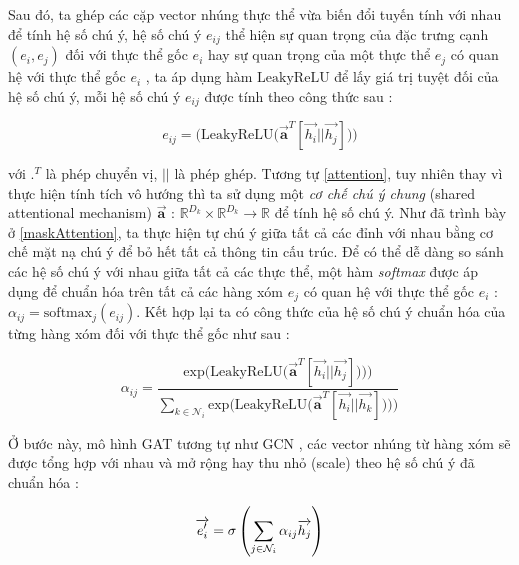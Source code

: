 Sau đó, ta ghép các cặp vector nhúng thực thể vừa biến đổi tuyến tính với nhau để tính hệ số chú ý, hệ số chú ý $e_{ij}$ thể hiện sự quan trọng của đặc trưng cạnh $(e_i, e_j)$ đối với thực thể gốc $e_i$ hay sự quan trọng của một thực thể $e_j$ có quan hệ với thực thể gốc $e_i$ , ta áp dụng hàm $\text{LeakyReLU}$ để lấy giá trị tuyệt đối của hệ số chú ý, mỗi hệ số chú ý $e_{ij}$ được tính theo công thức sau :

\begin{equation}
e_{ij} = \Big( \text{LeakyReLU} \Big( \overrightarrow{\mathbf{a}}^{T} [\overrightarrow{h_i} || \overrightarrow{h_j}]\Big) \Big)
\end{equation}

với ${.}^{T}$ là phép chuyển vị, $||$ là phép ghép. Tương tự \ref{attention}, tuy nhiên thay vì thực hiện tính tích vô hướng thì ta sử dụng một \textit{cơ chế chú ý chung} (shared attentional mechanism) $\overrightarrow{\mathbf{a}}$ : $\mathbb{R}^{D_k} \times \mathbb{R}^{D_k} \xrightarrow{} \mathbb{R}$ để tính hệ số chú ý. Như đã trình bày ở \ref{maskAttention}, ta thực hiện tự chú ý giữa tất cả các đỉnh với nhau bằng cơ chế mặt nạ chú ý để bỏ hết tất cả thông tin cấu trúc.
Để có thể dễ dàng so sánh các hệ số chú ý với nhau giữa tất cả các thực thể, một hàm \textit{softmax} được áp dụng để chuẩn hóa trên tất cả các hàng xóm $e_j$ có quan hệ với thực thể gốc $e_i$ : $\alpha_{ij} = \text{softmax}_j(e_{ij})$. Kết hợp lại ta có công thức của hệ số chú ý chuẩn hóa của từng hàng xóm đối với thực thể gốc như sau :

\begin{equation}
\label{attentionCoeff}
\alpha_{ij} = \frac{
	\text{exp} \Big( \text{LeakyReLU} \Big( \overrightarrow{\mathbf{a}}^{T} [ \overrightarrow{h_i} || \overrightarrow{h_j}]\Big) \Big))
}
{
	\sum_{k \in \mathcal{N}_i}
	\text{exp} \Big( \text{LeakyReLU} \Big( \overrightarrow{\mathbf{a}}^{T} [\overrightarrow{h_i} || \overrightarrow{h_k}]\Big) \Big))
}
\end{equation}

Ở bước này, mô hình GAT tương tự như GCN \cite{kipf2016semi}, các vector nhúng từ hàng xóm sẽ được tổng hợp với nhau và mở rộng hay thu nhỏ (scale) theo hệ số chú ý đã chuẩn hóa :

\begin{equation}
\label{scaleAttentionCoef}
\centering
{\overrightarrow{e'_i}}={\sigma\left(\sum_{j\in \mathcal{N}_i} {\alpha_{ij} \overrightarrow{h_j} }\right)}
\end{equation}

